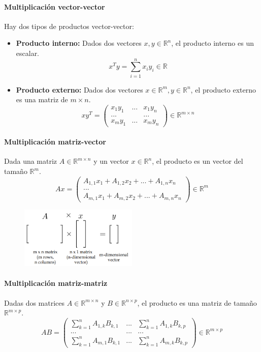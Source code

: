 \paragraph{Multiplicación vector-vector}
Hay dos tipos de productos vector-vector:
\begin{itemize}
\item \textbf{Producto interno:}
Dados dos vectores $x,y \in \mathbb{R}^n$, el producto interno es un escalar.
$$x^T y = \sum^n_{i=1} x_iy_i \in \mathbb{R} $$

\item \textbf{Producto externo:}
Dados dos vectores $x \in \mathbb{R}^m, y \in \mathbb{R}^n$, el producto externo es una matriz de $m \times n$.
$$xy^T = \begin{pmatrix}
x_1 y_1 & ... & x_1 y_n \\
...  & & ... \\
x_m y_1 & ... & x_m y_n
\end{pmatrix} \in \mathbb{R}^{m \times n}$$
\end{itemize}

\paragraph{Multiplicación matriz-vector} Dada una matriz $A \in \mathbb{R}^{m \times n}$ y un vector $x \in \mathbb{R}^n$, el producto es un vector del tamaño $\mathbb{R}^m$.
$$Ax = \begin{pmatrix}
A_{1,1}x_1 + A_{1,2}x_2 + ... + A_{1,n}x_n \\
... \\
A_{m,1}x_1 + A_{m,2}x_2 + ... + A_{m,n}x_n
\end{pmatrix} \in \mathbb{R}^m$$

\begin{figure}[h]
\centering
\includegraphics[width = 0.5\textwidth]{figs/matrix-vector-mult.png}
\end{figure}

\paragraph{Multiplicación matriz-matriz} Dadas dos matrices $A \in \mathbb{R}^{m \times n}$ y $B \in \mathbb{R}^{n \times p}$, el producto es una matriz de tamaño $\mathbb{R}^{m \times p}$.
$$AB = \begin{pmatrix}
\sum^n_{k=1}A_{1,k}B_{k,1} & ... & \sum^n_{k=1}A_{1,k}B_{k,p} \\
... & ... & ...\\
\sum^n_{k=1}A_{m,1}B_{k,1} & ... & \sum^n_{k=1}A_{m,k}B_{k,p}
\end{pmatrix} \in \mathbb{R}^{m \times p}$$

